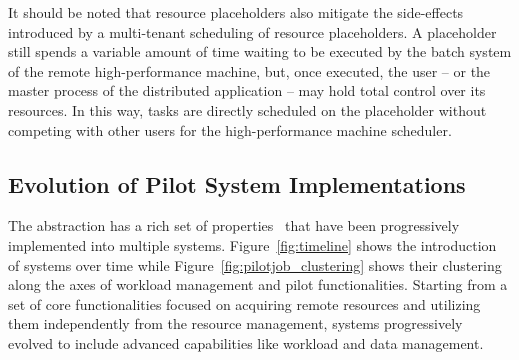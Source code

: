 \documentclass{sig-alternate}
\begin{document}
It should be noted that resource placeholders also mitigate the side-effects
introduced by a multi-tenant scheduling of resource placeholders. A placeholder
still spends a variable amount of time waiting to be executed by the batch
system of the remote high-performance machine, but, once executed, the user --
or the master process of the distributed application -- may hold total control
over its resources. In this way, tasks are directly scheduled on the placeholder
without competing with other users for the high-performance machine scheduler.


\subsection{Evolution of Pilot System Implementations}
\label{sec:histimpl}

The \pilot abstraction has a rich set of properties~\cite{pstar-2012} that have
been progressively implemented into multiple \pilotjob systems.
Figure~\ref{fig:timeline} shows the introduction of \pilotjob systems over time
while Figure~\ref{fig:pilotjob_clustering} shows their clustering along the axes
of workload management and pilot functionalities. Starting from a set of core
functionalities focused on acquiring remote resources and utilizing them
independently from the resource management, \pilotjob systems progressively
evolved to include advanced capabilities like workload and data management.


\end{document}

